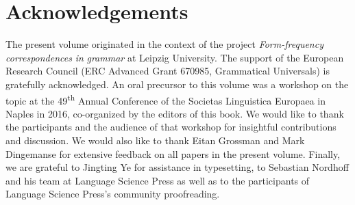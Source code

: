 \documentclass[output=paper]{langsci/langscibook}
\begin{document}
\section*{Acknowledgements}

The present volume originated in the context of the project \textit{Form-frequency} \textit{correspondences} \textit{in} \textit{grammar} at Leipzig University. The support of the European Research Council (ERC Advanced Grant 670985, Grammatical Universals) is gratefully acknowledged. An oral precursor to this volume was a workshop on the topic at the 49\textsuperscript{th} Annual Conference of the Societas Linguistica Europaea in Naples in 2016, co-organized by the editors of this book. We would like to thank the participants and the audience of that workshop for insightful contributions and discussion. We would also like to thank Eitan Grossman and Mark Dingemanse for extensive feedback on all papers in the present volume. Finally, we are grateful to Jingting Ye for assistance in typesetting, to Sebastian Nordhoff and his team at Language Science Press as well as to the participants of Language Science Press’s community proofreading.

\sloppy
\printbibliography[heading=subbibliography,notkeyword=this]
 
\end{document}
